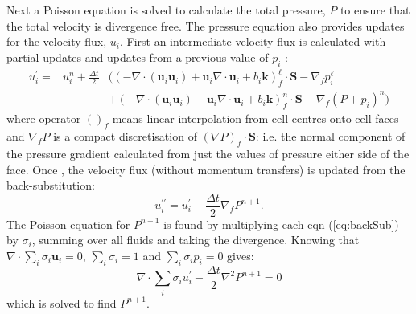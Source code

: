 \documentclass[draft]{agujournal2019}
\begin{document}
Next a Poisson equation is solved to calculate the total pressure,
$P$ to ensure that the total velocity is divergence free.  The pressure
equation also provides updates for the velocity flux, $u_{i}$. First
an intermediate velocity flux is calculated with partial updates and
updates from a previous value of $p_{i}$ :
\begin{eqnarray}
u_{i}^{\prime}= & u_{i}^{n}+\frac{\Delta t}{2} & \biggl(\left(-\nabla\cdot(\mathbf{u}_{i}\mathbf{u}_{i})+\mathbf{u}_{i}\nabla\cdot\mathbf{u}_{i}+b_{i}\mathbf{k}\right)_{f}^{\ell}\cdot\mathbf{S}-\nabla_{f}p_{i}^{\ell}\\
 &  & +\left(-\nabla\cdot(\mathbf{u}_{i}\mathbf{u}_{i})+\mathbf{u}_{i}\nabla\cdot\mathbf{u}_{i}+b_{i}\mathbf{k}\right)_{f}^{n}\cdot\mathbf{S}-\nabla_{f}(P+p_{i})^{n}\biggr)
\end{eqnarray}
where operator $()_{f}$ means linear interpolation from cell centres
onto cell faces and $\nabla_{f}P$ is a compact discretisation of
$(\nabla P)_{f}\cdot\mathbf{S}$: i.e. the normal component of the pressure
gradient calculated from just the values of pressure either side of
the face. Once , the velocity flux (without
momentum transfers) is updated from the back-substitution:
\begin{equation}
u_{i}^{\prime\prime}=u_{i}^{\prime}-\frac{\Delta t}{2}\nabla_{f}P^{n+1}.\label{eq:backSub}
\end{equation}
The Poisson equation for $P^{n+1}$ is found by multiplying each eqn
(\ref{eq:backSub}) by $\sigma_{i}$, summing over all fluids and
taking the divergence. Knowing that $\nabla\cdot\sum_{i}\sigma_{i}\mathbf{u}_{i}=0$,
$\sum_{i}\sigma_{i}=1$ and $\sum_{i}\sigma_{i}p_{i}=0$ gives:
\begin{equation}
\nabla\cdot\sum_{i}\sigma_{i}u_{i}^{\prime}-\frac{\Delta t}{2}\nabla^{2}P^{n+1}=0
\end{equation}
which is solved to find $P^{n+1}$. 
\end{document}
